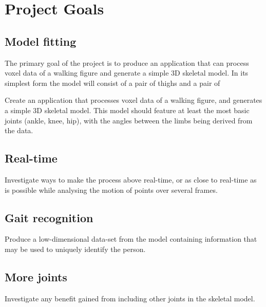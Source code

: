 \section{Project Goals}

\subsection{Model fitting}

The primary goal of the project is to produce an application that can process voxel data of a walking figure and generate a simple 3D skeletal model.
In its simplest form the model will consist of a pair of thighs and a pair of 

Create an application that processes voxel data of a walking figure, and generates a simple 3D skeletal model.
This model should feature at least the most basic joints (ankle, knee, hip),
with the angles between the limbs being derived from the data.

\subsection{Real-time}

Investigate ways to make the process above real-time,
or as close to real-time as is possible while analysing the motion of points over several frames.

\subsection{Gait recognition}

Produce a low-dimensional data-set from the model containing information that may be used to uniquely identify the person.

\subsection{More joints}

Investigate any benefit gained from including other joints in the skeletal model.

